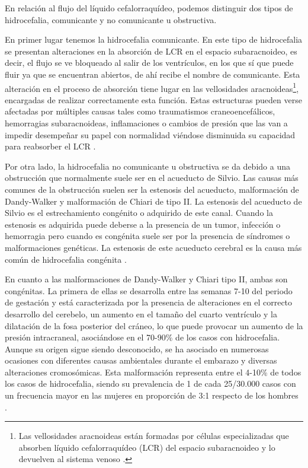 En relación al flujo del líquido cefalorraquídeo, podemos distinguir dos tipos de hidrocefalia, comunicante y no comunicante u obstructiva.

En primer lugar tenemos la hidrocefalia comunicante. En este tipo de hidrocefalia se presentan alteraciones en la absorción de LCR en el espacio subaracnoideo, es decir, el flujo se ve bloqueado al salir de los ventrículos, en los que sí que puede fluir ya que se encuentran abiertos, de ahí recibe el nombre de comunicante. Esta alteración en el proceso de absorción tiene lugar en las vellosidades aracnoideas\footnote{Las vellosidades aracnoideas están formadas por células especializadas que absorben líquido cefalorraquídeo (LCR) del espacio subaracnoideo y lo devuelven al sistema venoso \cite{vellosidad}.}, encargadas de realizar correctamente esta función. Estas estructuras pueden verse afectadas por múltiples causas tales como traumatismos craneoencefálicos, hemorragias subaracnoideas, inflamaciones o cambios de presión que las van a impedir desempeñar su papel con normalidad viéndose disminuida su capacidad para reabsorber el LCR \cite{wiki_hidrocefalia}.

Por otra lado, la hidrocefalia no comunicante u obstructiva se da debido a una obstrucción que normalmente suele ser en el acueducto de Silvio. Las causas más comunes de la obstrucción suelen ser la estenosis del acueducto, malformación de Dandy-Walker y malformación de Chiari de tipo II. La estenosis del acueducto de Silvio es el estrechamiento congénito o adquirido de este canal. Cuando la estenosis es adquirida puede deberse a la presencia de un tumor, infección o hemorragia pero cuando es congénita suele ser por la presencia de síndromes o malformaciones genéticas. La estenosis de este acueducto cerebral es la causa más común de hidrocefalia congénita \cite{msd_hidrocefalia}.

En cuanto a las malformaciones de Dandy-Walker y Chiari tipo II, ambas son congénitas. La primera de ellas se desarrolla entre las semanas 7-10 del periodo de gestación y está caracterizada por la presencia de alteraciones en el correcto desarrollo del cerebelo, un aumento en el tamaño del cuarto ventrículo y la dilatación de la fosa posterior del cráneo, lo que puede provocar un aumento de la presión intracraneal, asociándose en el 70-90\% de los casos con hidrocefalia. Aunque su origen sigue siendo desconocido, se ha asociado en numerosas ocasiones con diferentes causas ambientales durante el embarazo y diversas alteraciones cromosómicas.  Esta malformación representa entre el 4-10\% de todos los casos de hidrocefalia, siendo su prevalencia de 1 de cada 25/30.000 casos con un frecuencia mayor en las mujeres en proporción de 3:1 respecto de los hombres \cite{aepnya_article}. 


